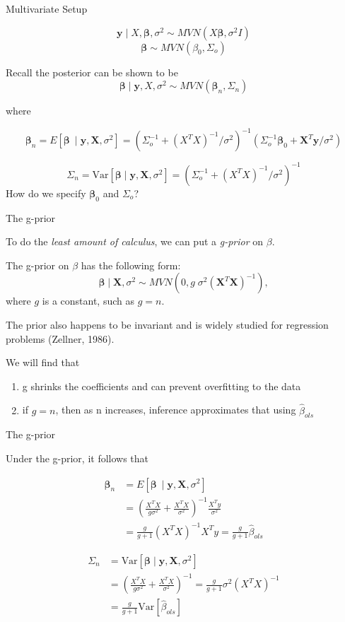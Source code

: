\documentclass[ignorenonframetext,]{beamer}
\providecommand{\tightlist}{%
  \setlength{\itemsep}{0pt}\setlength{\parskip}{0pt}}
\newcommand{\bbeta}{\bm{\beta}}
\newcommand{\by}   {\bm{y}}
\newcommand{\bX}   {\bm{X}}
\newcommand{\Var}{\text{Var}}
\begin{document}
\begin{frame}{Multivariate Setup}

\[\by \mid X,\bbeta, \sigma^2 \sim MVN( X\bbeta, \sigma^2 I)\]
\[\bbeta \sim MVN(\beta_0, \Sigma_o) \]

Recall the posterior can be shown to be
\[\bbeta \mid \bm{y}, X, \sigma^2 \sim MVN(\bbeta_n, \Sigma_n)\]

where

\[\bbeta_n = E[\bbeta\ \mid \bm{y}, \bX, \sigma^2] = (\Sigma_o^{-1} + (X^TX)^{-1}/\sigma^2)^{-1}
(\Sigma_o^{-1}\bbeta_0 + \bX^T\bm{y}/\sigma^2)\]

\[\Sigma_n = \text{Var}[\bbeta \mid \bm{y}, \bX, \sigma^2] = (\Sigma_o^{-1} + (X^TX)^{-1}/\sigma^2)^{-1}\]
How do we specify \(\bbeta_0\) and \(\Sigma_o\)?

\end{frame}

\begin{frame}{The g-prior}

To do the \emph{least amount of calculus}, we can put a \emph{g-prior}
on \(\beta.\)

The g-prior on \(\beta\) has the following form:
\[ \bbeta \mid \bX, \sigma^2  \sim MVN(0, g\; \sigma^2 (\bX^T\bX)^{-1}),\]
where \(g\) is a constant, such as \(g=n.\)

The prior also happens to be invariant and is widely studied for
regression problems (Zellner, 1986).

We will find that

\begin{enumerate}
\def\labelenumi{\arabic{enumi}.}
\tightlist
\item
  g shrinks the coefficients and can prevent overfitting to the data
\item
  if \(g = n\), then as n increases, inference approximates that using
  \(\hat{\beta}_{ols}\)
\end{enumerate}

\end{frame}

\begin{frame}{The g-prior}

Under the g-prior, it follows that

\begin{align}
\bbeta_n &= E[\bbeta\ \mid \bm{y}, \bX, \sigma^2]  \\
&= \left(\frac{X^TX}{g \sigma^2} + \frac{X^TX}{\sigma^2}\right)^{-1} \frac{X^Ty}{\sigma^2} \\
&= \frac{g}{g+1} (X^TX)^{-1} X^Ty
= \frac{g}{g+1} \hat{\beta}_{ols}
\end{align}

\begin{align}
\Sigma_n &= \text{Var}[\bbeta \mid \bm{y}, \bX, \sigma^2] \\
&= \left(\frac{X^TX}{g \sigma^2} + \frac{X^TX}{\sigma^2}\right)^{-1}
=\frac{g}{g+1} \sigma^2 (X^TX)^{-1} \\
&= \frac{g}{g+1} \Var[\hat{\beta}_{ols}]
\end{align}

\end{frame}
\end{document}
